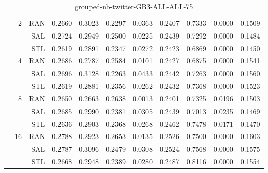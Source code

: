 \begin{center}
\begin{table}[htbp]
\begin{tabular}{ | r | r | r | r | r | r | r | r | r | r | r |}
 & \multirow{3}{*}{2} & RAN & 0.2660 & 0.3023 & 0.2297 & 0.0363 & 0.2407 & 0.7333 & 0.0000 & 0.1509\\ \cline{3-11}
 &   & SAL & 0.2724 & 0.2949 & 0.2500 & 0.0225 & 0.2439 & 0.7292 & 0.0000 & 0.1484\\ \cline{3-11}
 &   & STL & 0.2619 & 0.2891 & 0.2347 & 0.0272 & 0.2423 & 0.6869 & 0.0000 & 0.1450\\ \cline{2-11}
 & \multirow{3}{*}{4} & RAN & 0.2686 & 0.2787 & 0.2584 & 0.0101 & 0.2427 & 0.6875 & 0.0000 & 0.1541\\ \cline{3-11}
 &   & SAL & 0.2696 & 0.3128 & 0.2263 & 0.0433 & 0.2442 & 0.7263 & 0.0000 & 0.1560\\ \cline{3-11}
 &   & STL & 0.2619 & 0.2881 & 0.2356 & 0.0262 & 0.2432 & 0.7368 & 0.0000 & 0.1523\\ \cline{2-11}
 & \multirow{3}{*}{8} & RAN & 0.2650 & 0.2663 & 0.2638 & 0.0013 & 0.2401 & 0.7325 & 0.0196 & 0.1503\\ \cline{3-11}
 &   & SAL & 0.2685 & 0.2990 & 0.2381 & 0.0305 & 0.2439 & 0.7013 & 0.0235 & 0.1469\\ \cline{3-11}
 &   & STL & 0.2636 & 0.2903 & 0.2368 & 0.0268 & 0.2462 & 0.7478 & 0.0171 & 0.1470\\ \cline{2-11}
 & \multirow{3}{*}{16} & RAN & 0.2788 & 0.2923 & 0.2653 & 0.0135 & 0.2526 & 0.7500 & 0.0000 & 0.1603\\ \cline{3-11}
 &   & SAL & 0.2787 & 0.3096 & 0.2479 & 0.0308 & 0.2524 & 0.7568 & 0.0000 & 0.1575\\ \cline{3-11}
 &   & STL & 0.2668 & 0.2948 & 0.2389 & 0.0280 & 0.2487 & 0.8116 & 0.0000 & 0.1554\\ \cline{2-11}
\hline
\end{tabular}
\caption{grouped-nb-twitter-GB3-ALL-ALL-75}
\end{table}
\end{center}

